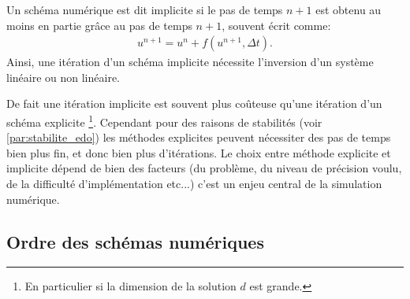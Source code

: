 \begin{definition}
    Un schéma numérique est dit implicite si le pas de temps $n+1$ est obtenu au moins en partie grâce au pas de temps $n+1$, souvent écrit comme:
    \begin{align}
        u^{n+1} = u^n + f(u^{n+1} ,\Delta t ).
    \end{align}
    Ainsi, une itération d'un schéma implicite nécessite l'inversion d'un système linéaire ou non linéaire. 
\end{definition}
De fait une itération implicite est souvent plus coûteuse qu'une itération d'un schéma explicite
\footnote{En particulier si la dimension de la solution $d$ est grande.}. 
Cependant pour des raisons de stabilités (voir \ref{par:stabilite_edo}) les méthodes explicites peuvent nécessiter des pas de temps bien plus fin, et donc bien plus d'itérations.
Le choix entre méthode explicite et implicite dépend de bien des facteurs (du problème, du niveau de précision voulu, de la difficulté d'implémentation etc...)
c'est un enjeu central de la simulation numérique.
\subsection{Ordre des schémas numériques}

